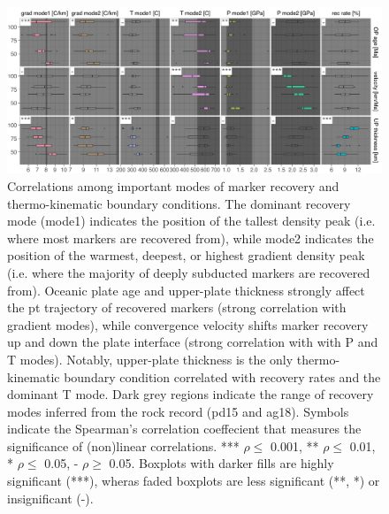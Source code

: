 \begin{landscape}




\begin{figure}[htbp]

{\centering \includegraphics[width=1\linewidth,]{assets/figs/chpt4/correlations_comp} 

}

\caption[Recovery rates for all 64 subduction simulations]{Correlations among important modes of marker recovery and thermo-kinematic boundary conditions. The dominant recovery mode (mode1) indicates the position of the tallest density peak (i.e. where most markers are recovered from), while mode2 indicates the position of the warmest, deepest, or highest gradient density peak (i.e. where the majority of deeply subducted markers are recovered from). Oceanic plate age and upper-plate thickness strongly affect the \gls{pt} trajectory of recovered markers (strong correlation with gradient modes), while convergence velocity shifts marker recovery up and down the plate interface (strong correlation with with P and T modes). Notably, upper-plate thickness is the only thermo-kinematic boundary condition correlated with recovery rates and the dominant T mode. Dark grey regions indicate the range of recovery modes inferred from the rock record (pd15 and ag18). Symbols indicate the Spearman's correlation coeffecient that measures the significance of (non)linear correlations. *** $\rho \leq$ 0.001, ** $\rho \leq$ 0.01, * $\rho \leq$ 0.05, - $\rho \geq$ 0.05. Boxplots with darker fills are highly significant (***), wheras faded boxplots are less significant (**, *) or insignificant (-).}\label{fig:corrComp}
\end{figure}


\end{landscape}

\begingroup
\renewcommand{\arraystretch}{0.5}

